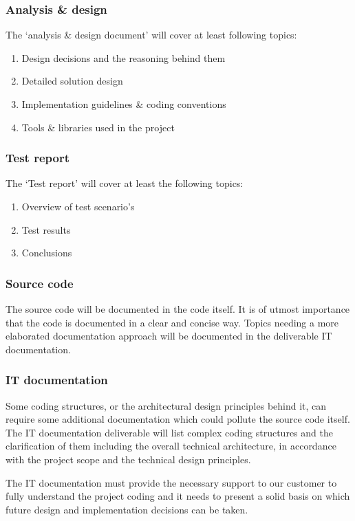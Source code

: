 \subsubsection{Analysis \& design}
The `analysis \& design document' will cover at least following topics:

	\begin{enumerate}
		\item Design decisions and the reasoning behind them
		\item Detailed solution design
		\item Implementation guidelines \& coding conventions
		\item Tools \& libraries used in the project
	\end {enumerate}

\subsubsection{Test report}
The `Test report' will cover at least the following topics:

	\begin{enumerate}
		\item Overview of test scenario's
		\item Test results
		\item Conclusions
	\end {enumerate}

\subsubsection{Source code}
The source code will be documented in the code itself.
It is of utmost importance that the code is documented in a clear and concise way.
Topics needing a more elaborated documentation approach will be documented in the deliverable IT documentation.

\subsubsection{IT documentation}
Some coding structures, or the architectural design principles behind it, can require some additional documentation which could pollute the source code itself.
The IT documentation deliverable will list complex coding structures and the clarification of them including the overall technical architecture, in accordance with the project scope and the technical design principles.

The IT documentation must provide the necessary support to our customer to fully understand the project coding and it needs to present a solid basis on which future design and implementation decisions can be taken.


